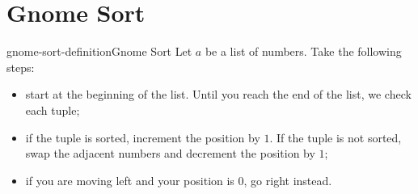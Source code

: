 \documentclass[preview]{standalone}
\begin{document}
\genpage

\section{Gnome Sort}

\begin{snippetdefinition}{gnome-sort-definition}{Gnome Sort}
    Let \(a\) be a list of numbers. Take the following steps:
    \begin{itemize}
        \item start at the beginning of the list. Until you reach the end of the list, we check each tuple;
        \item if the tuple is sorted, increment the position by \(1\). If the tuple is not sorted, swap the adjacent numbers and decrement the position by \(1\);
        \item if you are moving left and your position is \(0\), go right instead.
    \end{itemize}
    \hr
    \begin{algorithmic}[1]

                \Else
                \EndIf
            \Else
            \EndIf
        \EndWhile
    \end{algorithmic}
    \hr
\end{snippetdefinition}
\end{document}
